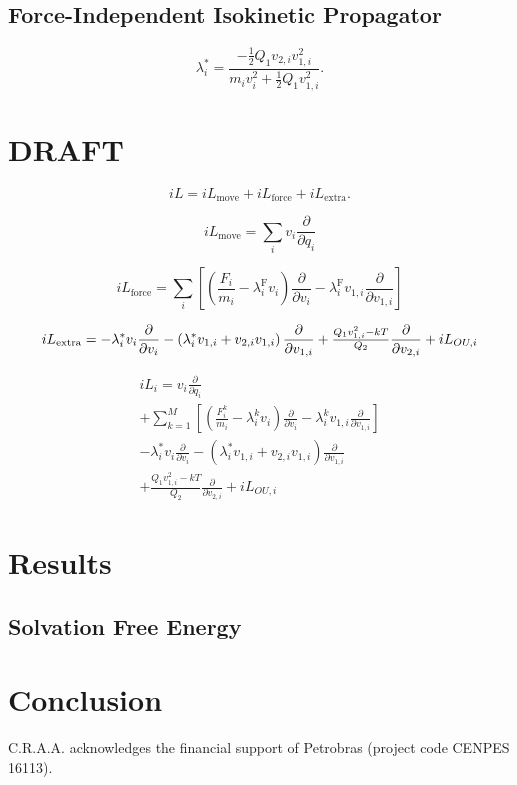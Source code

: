 \documentclass[
    journal=jctcce,
    layout=twocolumn
]{achemso}
\newcommand{\diff}[2]{\frac{\partial #2}{\partial #1}} %
\newcommand{\dof}{i}   %
\begin{document}
\subsection{Force-Independent Isokinetic Propagator}

\begin{equation}
\lambda^\ast_\dof = \frac{- \frac{1}{2} Q_1 v_{2,\dof} v_{1,\dof}^2}{m_\dof v_\dof^2 + \frac{1}{2} Q_1 v_{1,\dof}^2}.
\end{equation}


\section{DRAFT}




\begin{equation}
iL = iL_\mathrm{move} + iL_\mathrm{force} + iL_\mathrm{extra}.
\end{equation}

\begin{equation}
iL_\mathrm{move} = \sum_\dof v_\dof\diff{q_\dof}{}
\end{equation}

\begin{equation}
iL_\mathrm{force} = \sum_\dof \left[ \left(\frac{F_\dof}{m_\dof} - \lambda^\mathrm{F}_\dof v_\dof\right)\diff{v_\dof}{} - \lambda^\mathrm{F}_\dof v_{1,\dof}\diff{v_{1,\dof}}{} \right]
\end{equation}

\begin{equation}
iL_\mathrm{extra} = - \lambda^\ast_\dof v_\dof\diff{v_\dof}{} - \left(\lambda^\ast_\dof v_{1,\dof} + v_{2,\dof} v_{1,\dof}\right)\diff{v_{1,\dof}}{} \\
+ \tfrac{Q_1 v_{1,\dof}^2 - kT}{Q_2}\diff{v_{2,\dof}}{}
+ iL_{OU,\dof}
\end{equation}

\begin{multline}
iL_\dof = v_\dof\diff{q_\dof}{} \\
+ \sum_{k=1}^M \left[ \left(\frac{F^k_\dof}{m_\dof} - \lambda^k_\dof v_\dof\right)\diff{v_\dof}{} - \lambda^k_\dof v_{1,\dof}\diff{v_{1,\dof}}{} \right] \\
- \lambda^\ast_\dof v_\dof\diff{v_\dof}{} - \left(\lambda^\ast_\dof v_{1,\dof} + v_{2,\dof} v_{1,\dof}\right)\diff{v_{1,\dof}}{} \\
+ \tfrac{Q_1 v_{1,\dof}^2 - kT}{Q_2}\diff{v_{2,\dof}}{}
+ iL_{OU,\dof}
\end{multline}

\section{Results}

\subsection{Solvation Free Energy}
\label{sec:solvation free energy}


\section{Conclusion}


\begin{acknowledgement}

C.R.A.A. acknowledges the financial support of Petrobras (project code CENPES 16113).

\end{acknowledgement}


\end{document}
